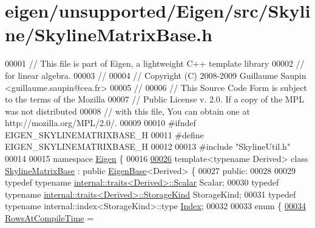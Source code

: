 \hypertarget{eigen_2unsupported_2_eigen_2src_2_skyline_2_skyline_matrix_base_8h_source}{}\section{eigen/unsupported/\+Eigen/src/\+Skyline/\+Skyline\+Matrix\+Base.h}
\label{eigen_2unsupported_2_eigen_2src_2_skyline_2_skyline_matrix_base_8h_source}

\begin{DoxyCode}
00001 \textcolor{comment}{// This file is part of Eigen, a lightweight C++ template library}
00002 \textcolor{comment}{// for linear algebra.}
00003 \textcolor{comment}{//}
00004 \textcolor{comment}{// Copyright (C) 2008-2009 Guillaume Saupin <guillaume.saupin@cea.fr>}
00005 \textcolor{comment}{//}
00006 \textcolor{comment}{// This Source Code Form is subject to the terms of the Mozilla}
00007 \textcolor{comment}{// Public License v. 2.0. If a copy of the MPL was not distributed}
00008 \textcolor{comment}{// with this file, You can obtain one at http://mozilla.org/MPL/2.0/.}
00009 
00010 \textcolor{preprocessor}{#ifndef EIGEN\_SKYLINEMATRIXBASE\_H}
00011 \textcolor{preprocessor}{#define EIGEN\_SKYLINEMATRIXBASE\_H}
00012 
00013 \textcolor{preprocessor}{#include "SkylineUtil.h"}
00014 
00015 \textcolor{keyword}{namespace }\hyperlink{namespace_eigen}{Eigen} \{ 
00016 
\hyperlink{class_eigen_1_1_skyline_matrix_base}{00026} \textcolor{keyword}{template}<\textcolor{keyword}{typename} Derived> \textcolor{keyword}{class }\hyperlink{class_eigen_1_1_skyline_matrix_base}{SkylineMatrixBase} : \textcolor{keyword}{public} 
      \hyperlink{group___core___module_struct_eigen_1_1_eigen_base}{EigenBase}<Derived> \{
00027 \textcolor{keyword}{public}:
00028 
00029     \textcolor{keyword}{typedef} \textcolor{keyword}{typename} \hyperlink{struct_eigen_1_1internal_1_1traits}{internal::traits<Derived>::Scalar} Scalar;
00030     \textcolor{keyword}{typedef} \textcolor{keyword}{typename} \hyperlink{struct_eigen_1_1internal_1_1traits}{internal::traits<Derived>::StorageKind} 
      StorageKind;
00031     \textcolor{keyword}{typedef} \textcolor{keyword}{typename} internal::index<StorageKind>::type \hyperlink{group___core___module_a554f30542cc2316add4b1ea0a492ff02}{Index};
00032 
00033     \textcolor{keyword}{enum} \{
\hyperlink{class_eigen_1_1_skyline_matrix_base_a811ba3961cb927ae5fa84ed278ebceeaa22b71b821112b0ccf61b7317b9ac4cf4}{00034}         \hyperlink{class_eigen_1_1_skyline_matrix_base_a811ba3961cb927ae5fa84ed278ebceeaa22b71b821112b0ccf61b7317b9ac4cf4}{RowsAtCompileTime} = 

\end{DoxyCode}
